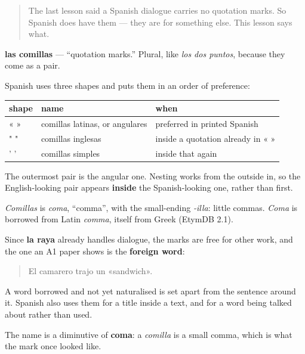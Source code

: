\label{lesson:ES-C424-comillas}



\begin{quote}
The last lesson said a Spanish dialogue carries no quotation marks. So Spanish does have them — they are for something else. This lesson says what.
\end{quote}

\begin{cousinweb}
\textbf{las comillas} — \textquotedblleft{}quotation marks.\textquotedblright{} Plural, like \emph{los dos puntos}, because they come as a pair.

Spanish uses three shapes and puts them in an order of preference:

\noindent
\begin{tabularx}{\linewidth}{@{}>{\raggedright\arraybackslash}X>{\raggedright\arraybackslash}X>{\raggedright\arraybackslash}X@{}}
\toprule
\textbf{shape} & \textbf{name} & \textbf{when} \\
\midrule
« » & comillas latinas, or angulares & preferred in printed Spanish \\
" " & comillas inglesas & inside a quotation already in « » \\
' ' & comillas simples & inside that again \\
\bottomrule
\end{tabularx}

The outermost pair is the angular one. Nesting works from the outside in, so the English-looking pair appears \textbf{inside} the Spanish-looking one, rather than first.

\emph{Comillas} is \emph{coma}, \textquotedblleft{}comma\textquotedblright{}, with the small-ending \emph{-illa}: little commas. \emph{Coma} is borrowed from Latin \emph{comma}, itself from Greek (EtymDB 2.1).
\end{cousinweb}

\begin{grammarlens}[title={Grammar Lens: what they are actually for}]
Since \textbf{la raya} already handles dialogue, the marks are free for other work, and the one an A1 paper shows is the \textbf{foreign word}:

\begin{quote}
El camarero trajo un «sandwich».
\end{quote}

A word borrowed and not yet naturalised is set apart from the sentence around it. Spanish also uses them for a title inside a text, and for a word being talked about rather than used.

The name is a diminutive of \textbf{coma}: a \emph{comilla} is a small comma, which is what the mark once looked like.
\end{grammarlens}

